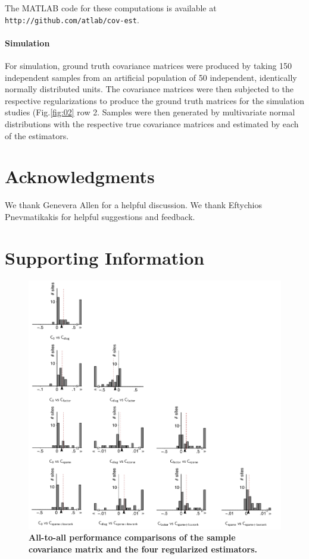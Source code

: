 \documentclass[10pt]{article}
\newcommand{\figref}[2]{Fig.\;\ref{fig:#1}\,#2}
\begin{document}
The MATLAB code for these computations is available at {\tt http://github.com/atlab/cov-est}.


\paragraph{Simulation}
For simulation, ground truth covariance matrices were produced by taking 150 independent samples from an artificial population of 50 independent, identically normally distributed units. The covariance matrices were then subjected to the respective regularizations to produce the ground truth matrices for the simulation studies (\figref{02}{\,row 2}. Samples were then generated by multivariate normal distributions with the respective true covariance matrices and estimated by each of the estimators. 

\section*{Acknowledgments}
We thank Genevera Allen for a helpful discussion.  We thank Eftychios Pnevmatikakis for helpful suggestions and feedback.




\newpage
\section*{Supporting Information}
\setcounter{figure}{0}

\begin{figure}[!ht]
\begin{center}
\includegraphics{./figures/Figure-Supp01.pdf}
\end{center}
\caption{{\bf All-to-all performance comparisons of the sample covariance matrix and the four regularized estimators.}
}
\label{supp:01}
\end{figure}
\end{document}
